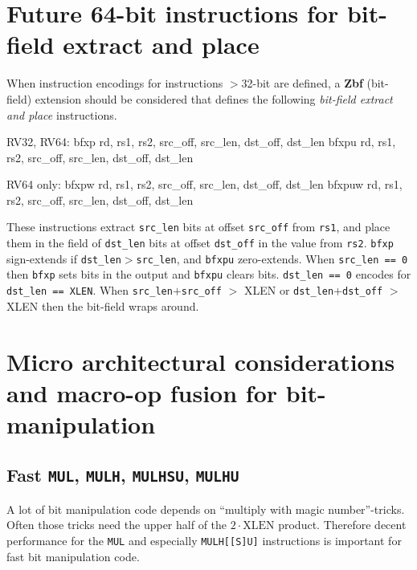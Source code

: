 
\section{Future 64-bit instructions for bit-field extract and place}

When instruction encodings for instructions $>$32-bit are defined, a {\bf Zbf} (bit-field)
extension should be considered that defines the following {\it bit-field extract and place}
instructions.

\begin{rvb}
  RV32, RV64:
    bfxp  rd, rs1, rs2, src_off, src_len, dst_off, dst_len
    bfxpu rd, rs1, rs2, src_off, src_len, dst_off, dst_len

  RV64 only:
    bfxpw  rd, rs1, rs2, src_off, src_len, dst_off, dst_len
    bfxpuw rd, rs1, rs2, src_off, src_len, dst_off, dst_len
\end{rvb}

These instructions extract {\tt src\_len} bits at offset {\tt src\_off} from {\tt rs1},
and place them in the field of {\tt dst\_len} bits at offset {\tt dst\_off} in the
value from {\tt rs2}. {\tt bfxp} sign-extends if {\tt dst\_len}$>${\tt src\_len},
and {\tt bfxpu} zero-extends. When {\tt src\_len == 0} then {\tt bfxp} sets bits
in the output and {\tt bfxpu} clears bits. {\tt dst\_len == 0} encodes for
{\tt dst\_len == XLEN}. When {\tt src\_len}$+${\tt src\_off} $>$ XLEN
or {\tt dst\_len}$+${\tt dst\_off} $>$ XLEN then the bit-field wraps around.




\section{Micro architectural considerations and macro-op fusion for bit-manipulation}


\subsection{Fast {\tt MUL}, {\tt MULH}, {\tt MULHSU}, {\tt MULHU}}

A lot of bit manipulation code depends on ``multiply with magic number''-tricks. Often those
tricks need the upper half of the $2 \cdot \textrm{XLEN}$ product. Therefore decent performance
for the \texttt{MUL} and especially \texttt{MULH[[S]U]} instructions is important for fast
bit manipulation code.

